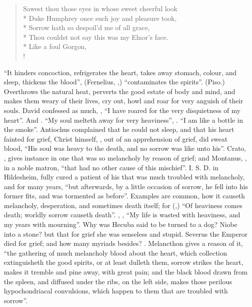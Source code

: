 \begin{verse}%
Sawest thou those eyes in whose sweet cheerful look\\*
Duke Humphrey once such joy and pleasure took,\\*
Sorrow hath so despoil'd me of all grace,\\*
Thou couldst not say this was my Elnor's face.\\*
Like a foul Gorgon, \etc{}\\!
\end{verse}%

\enquote{It hinders concoction, refrigerates the heart, takes away
stomach, colour, and sleep, thickens the blood},
(Fernelius, ,) \enquote{contaminates the spirits}. (Piso.) Overthrows
the natural heat, perverts the good estate of body and mind, and makes them
weary of their lives, cry out, howl and roar for very anguish of their souls.
David confessed as much, , \enquote{I have roared for
the very disquietness of my heart}. And .
\enquote{My soul melteth away for very heaviness}, . \enquote{I am like a bottle
in the smoke}. Antiochus complained that he could not sleep, and that his heart
fainted for grief, Christ himself, , out
of an apprehension of grief, did sweat blood,  \enquote{His
soul was heavy to the death, and no sorrow was like unto his}. Crato,
, gives instance in one that was so
melancholy by reason of grief; and Montanus,
, in a noble matron,
\enquote{that had no other cause of this mischief}. I. S. D. in
Hildesheim, fully cured a patient of his that was much troubled with
melancholy, and for many years, \enquote{but afterwards, by a
little occasion of sorrow, he fell into his former fits, and was tormented as
before}. Examples are common, how it causeth melancholy,
desperation, and sometimes death itself; for
(,) \enquote{Of heaviness comes death; worldly sorrow
causeth death}. , ,
\enquote{My life is wasted with heaviness, and my years with mourning}. Why was Hecuba
said to be turned to a dog? Niobe into a stone? but that for grief she was
senseless and stupid. Severus the Emperor died for grief;
and how many myriads besides? . Melancthon gives a reason of
it, \enquote{the gathering of much melancholy blood about the
heart, which collection extinguisheth the good spirits, or at least dulleth
them, sorrow strikes the heart, makes it tremble and pine away, with great
pain; and the black blood drawn from the spleen, and diffused under the ribs,
on the left side, makes those perilous hypochondriacal convulsions, which
happen to them that are troubled with sorrow}.

